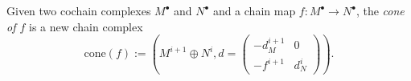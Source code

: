 
 
 
Given two cochain complexes $M^\bullet$ and $N^\bullet$ and a chain map $f: M^\bullet\to N^\bullet$, the \emph{cone of $f$} is a new chain complex
\[\text{cone}(f):=\left(M^{i+1}\oplus N^i, d=\begin{pmatrix}- d_M^{i+1} & 0 \\ - f^{i+1} & d_N^i\end{pmatrix}\right).\]

 